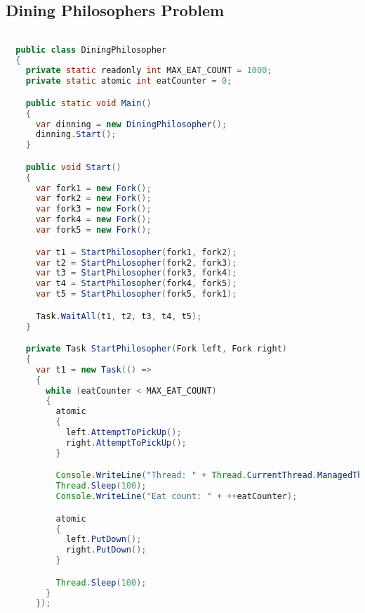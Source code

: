 \section{\stmname}\label{app:impl_stm_lab}
\subsection{Dining Philosophers Problem}
\begin{lstlisting}[label=lst:impl_dining_lang,
  caption={\stmname Based Concurrent Hashmap Implementation},
  language=Java,  
  showspaces=false,
  showtabs=false,
  breaklines=true,
  showstringspaces=false,
  breakatwhitespace=true,
  commentstyle=\color{greencomments},
  keywordstyle=\color{bluekeywords},
  stringstyle=\color{redstrings},
  escapechar=~,
  morekeywords={atomic, retry, orelse, var, get, set, ref, out, readonly, virtual, override, region, endregion, foreach, lock}]  % Start your code-block

  public class DiningPhilosopher
  {
    private static readonly int MAX_EAT_COUNT = 1000;
    private static atomic int eatCounter = 0;

    public static void Main()
    {
      var dinning = new DiningPhilosopher();
      dinning.Start();
    }

    public void Start()
    {
      var fork1 = new Fork();
      var fork2 = new Fork();
      var fork3 = new Fork();
      var fork4 = new Fork();
      var fork5 = new Fork();

      var t1 = StartPhilosopher(fork1, fork2);
      var t2 = StartPhilosopher(fork2, fork3);
      var t3 = StartPhilosopher(fork3, fork4);
      var t4 = StartPhilosopher(fork4, fork5);
      var t5 = StartPhilosopher(fork5, fork1);

      Task.WaitAll(t1, t2, t3, t4, t5);
    }

    private Task StartPhilosopher(Fork left, Fork right)
    {
      var t1 = new Task(() =>
      {
        while (eatCounter < MAX_EAT_COUNT)
        {
          atomic
          {
            left.AttemptToPickUp();
            right.AttemptToPickUp();
          }

          Console.WriteLine("Thread: " + Thread.CurrentThread.ManagedThreadId + " eating.");
          Thread.Sleep(100);
          Console.WriteLine("Eat count: " + ++eatCounter);

          atomic
          {
            left.PutDown();
            right.PutDown();
          }

          Thread.Sleep(100);
        }
      });


\end{lstlisting}

